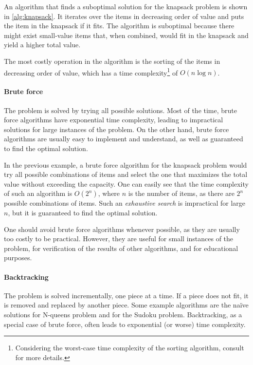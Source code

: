 An algorithm that finds a suboptimal solution for the knapsack problem is shown in
\cref{alg:knapsack}.
It iterates over the items in decreasing order of value and puts the item in the
knapsack if it fits.  The algorithm is suboptimal because there might exist small-value
items that, when combined, would fit in the knapsack and yield a higher total value.

The most costly operation in the algorithm is the sorting of the items in
decreasing order of value, which has a time complexity\footnote{%
Considering the worst-case time complexity of the sorting algorithm, consult
 for more details.} of $O(n \log n)$.

\paragraph{Brute force}  The problem is solved by trying all possible solutions.  Most of
the time, brute force algorithms have exponential time complexity, leading to impractical
solutions for large instances of the problem.  On the other hand, brute force algorithms
are usually easy to implement and understand, as well as guaranteed to find the optimal
solution.

In the previous example, a brute force algorithm for the knapsack problem would
try all possible combinations of items and select the one that maximizes the total value
without exceeding the capacity.  One can easily see that the time complexity of such an
algorithm is $O(2^n)$, where $n$ is the number of items, as there are $2^n$ possible
combinations of items.  Such an \emph{exhaustive search} is impractical for large $n$,
but it is guaranteed to find the optimal solution.

One should avoid brute force algorithms whenever possible, as they are usually too costly
to be practical.  However, they are useful for small instances of the problem, for
verification of the results of other algorithms, and for educational purposes.

\paragraph{Backtracking}  The problem is solved incrementally, one piece at a time.  If a
piece does not fit, it is removed and replaced by another piece.  Some example algorithms
are the naïve solutions for N-queens problem and for the Sudoku problem.  Backtracking, as
a special case of brute force, often leads to exponential (or worse) time complexity.

